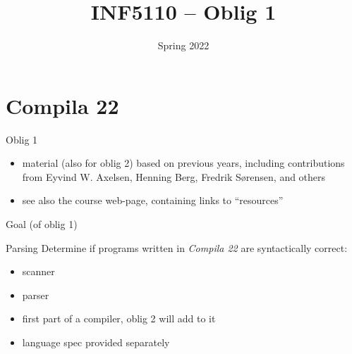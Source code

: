 \documentclass{beamer}
\date{Spring 2022}
\title{INF5110 -- Oblig  1}
\renewcommand{\maketitle}{}
\begin{document}
\maketitle
\section{Compila 22}
\label{sec:org748b3e2}

\begin{frame}[label={sec:org4645a18}]{Oblig 1}
\begin{itemize}
\item material (also for oblig 2) based on previous years, including contributions from Eyvind
W. Axelsen, Henning Berg, Fredrik Sørensen, and others
\end{itemize}


\begin{itemize}
\item see also the course web-page, containing links to ``resources''
\end{itemize}
\end{frame}


\begin{frame}[label={sec:orgb2a46e0}]{Goal (of oblig 1)}
\begin{block}{Parsing}
Determine if programs written in \emph{Compila 22} are syntactically correct: 

\begin{itemize}
\item scanner
\item parser
\end{itemize}
\end{block}


\begin{itemize}
\item first part of a compiler, oblig 2 will add to it
\item language spec provided separately
\end{itemize}
\end{frame}
\end{document}
